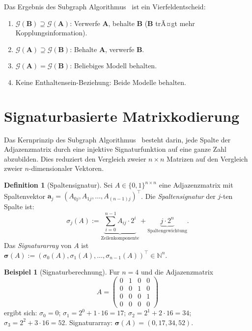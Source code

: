 ﻿\documentclass[12pt, a4paper, titlepage]{report}
\theoremstyle{definition}
\newtheorem{definition}[theorem]{Definition}
\newtheorem{example}[theorem]{Beispiel}
\theoremstyle{remark}
\newcommand{\vA}{\bm{A}}
\newcommand{\vB}{\bm{B}}
\newcommand{\T}{\top}
\begin{document}
Das Ergebnis des Subgraph Algorithmus~\citep{epp2026subgraph} ist ein
Vierfeldentscheid:
\begin{enumerate}[label=(\roman*)]
  \item $\mathcal{G}(\vB) \supseteq \mathcal{G}(\vA)$: Verwerfe $\vA$, behalte $\vB$
    ($\vB$ trÃ¤gt mehr Kopplungsinformation).
  \item $\mathcal{G}(\vA) \supseteq \mathcal{G}(\vB)$: Behalte $\vA$, verwerfe $\vB$.
  \item $\mathcal{G}(\vA) = \mathcal{G}(\vB)$: Beliebiges Modell behalten.
  \item Keine Enthaltensein-Beziehung: Beide Modelle behalten.
\end{enumerate}

\section{Signaturbasierte Matrixkodierung}

Das Kernprinzip des Subgraph Algorithmus~\citep{epp2026subgraph} besteht darin, jede
Spalte der Adjazenzmatrix durch eine injektive Signaturfunktion auf eine ganze Zahl
abzubilden. Dies reduziert den Vergleich zweier $n \times n$ Matrizen auf den Vergleich
zweier $n$-dimensionaler Vektoren.

\begin{definition}[Spaltensignatur]
\label{def:signatur}
Sei $A \in \{0,1\}^{n \times n}$ eine Adjazenzmatrix mit Spaltenvektor
$\bm{a}_j = (A_{0j}, A_{1j}, \ldots, A_{(n-1)j})^\T$.
Die \emph{Spaltensignatur} der $j$-ten Spalte ist:
\begin{equation}
  \sigma_j(A) :=
    \underbrace{\sum_{i=0}^{n-1} A_{ij} \cdot 2^i}_{\text{Zeilenkomponente}}
    + \underbrace{j \cdot 2^n}_{\text{Spaltengewichtung}}.
  \label{eq:signatur}
\end{equation}
Das \emph{Signaturarray} von $A$ ist
$\bm{\sigma}(A) := (\sigma_0(A), \sigma_1(A), \ldots, \sigma_{n-1}(A))^\T \in \mathbb{N}^n$.
\end{definition}

\begin{example}[Signaturberechnung]
\label{bsp:signatur}
Fur $n = 4$ und die Adjazenzmatrix
\[
  A = \begin{pmatrix}
    0 & 1 & 0 & 0 \\
    0 & 0 & 1 & 0 \\
    0 & 0 & 0 & 1 \\
    0 & 0 & 0 & 0
  \end{pmatrix}
\]
ergibt sich: $\sigma_0 = 0$; $\sigma_1 = 2^0 + 1 \cdot 16 = 17$;
$\sigma_2 = 2^1 + 2 \cdot 16 = 34$; $\sigma_3 = 2^2 + 3 \cdot 16 = 52$.
Signaturarray: $\bm{\sigma}(A) = (0, 17, 34, 52)$.
\end{example}
\end{document}
